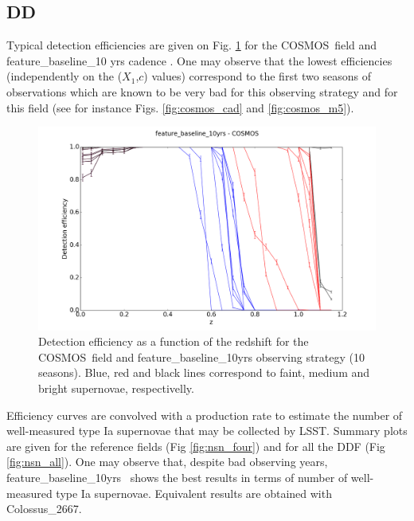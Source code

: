 \documentclass [11pt,a4paper]{article}
\newcommand{\cosmos}{COSMOS}
\newcommand{\feature}{feature\_baseline\_10yrs}
\newcommand{\strech}{$X_1$}
\newcommand{\sncolor}{$c$}
\begin{document}
\subsection{ DD}

Typical detection efficiencies are given on Fig. \ref{fig:effi} for the \cosmos~field and feature\_baseline\_10 yrs cadence . One may observe that the lowest efficiencies (independently on the (\strech,\sncolor) values) correspond to the first two seasons of observations which are known to be very bad for this observing strategy and for this field (see for instance Figs. \ref{fig:cosmos_cad} and \ref{fig:cosmos_m5}).

\begin{figure}[htbp]
\begin{center}
  
  \includegraphics[width=12cm]{Figures/effi_feature_cosmos.png}
 \caption{Detection efficiency as a function of the redshift for the \cosmos~field and feature\_baseline\_10yrs observing strategy (10 seasons). Blue, red and black lines correspond to faint, medium and bright supernovae, respectivelly.}\label{fig:effi}
\end{center}
\end{figure}

Efficiency curves are convolved with a production rate \cite{perrett} to estimate the number of well-measured type Ia supernovae that may be collected by LSST. Summary plots are given for the reference fields (Fig \ref{fig:nsn_four}) and for all the DDF (Fig \ref{fig:nsn_all}). One may observe that, despite bad observing years, \feature~ shows the best results in terms of number of well-measured type Ia supernovae. Equivalent results are obtained with Colossus\_2667.
\end{document}
